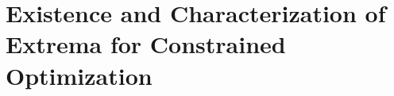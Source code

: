 
\chapter[Constrained Optimization]{Existence and Characterization of Extrema for Constrained Optimization}
\label{chapter:ConstrainedExistenceCharacterization}